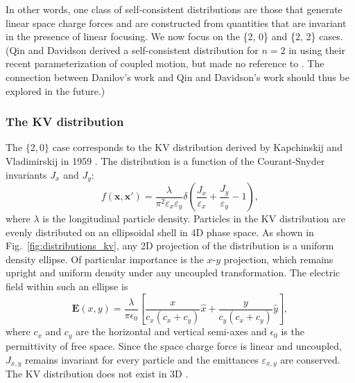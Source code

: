 In other words, one class of self-consistent distributions are those that generate linear space charge forces and are constructed from quantities that are invariant in the presence of linear focusing. We now focus on the \{2, 0\} and \{2, 2\} cases. (Qin and Davidson derived a self-consistent distribution for $n = 2$ in \cite{Qin2013} using their recent parameterization of coupled motion, but made no reference to \cite{Danilov2003}. The connection between Danilov's work and Qin and Davidson's work should thus be explored in the future.)


\subsubsection{The KV distribution}

The $\{2, 0\}$ case corresponds to the KV distribution derived by Kapchinskij and Vladimirskij in 1959 \cite{Kapchinskij1959}. The distribution is a function of the Courant-Snyder invariants $J_x$ and $J_y$:
%
\begin{equation}
    f(\mathbf{x}, \mathbf{x}') = \frac{\lambda}{\pi^2 \varepsilon_x\varepsilon_y}
    \delta \left(\frac{J_x}{\varepsilon_x} + \frac{J_y}{\varepsilon_y} -1 \right),
\end{equation}
%
where $\lambda$ is the longitudinal particle density. Particles in the KV distribution are evenly distributed on an ellipsoidal shell in 4D phase space. As shown in Fig.~\ref{fig:distributions_kv}, any 2D projection of the distribution is a uniform density ellipse. Of particular importance is the $x$-$y$ projection, which remains upright and uniform density under any uncoupled transformation. The electric field within such an ellipse is
%
\begin{equation}  \label{eq:field_in_upright_ellipse}
    \mathbf{E}(x, y) =
    \frac{\lambda}{\pi\epsilon_0}
    \left[ 
        \frac{x}{c_x\left(c_x+c_y\right)} \hat{x}
        + \frac{y}{c_y\left(c_x+c_y\right)} \hat{y}
    \right],
\end{equation}
%
where $c_x$ and $c_y$ are the horizontal and vertical semi-axes and $\epsilon_0$ is the permittivity of free space. Since the space charge force is linear and uncoupled, $J_{x,y}$ remains invariant for every particle and the emittances $\varepsilon_{x,y}$ are conserved. The KV distribution does not exist in 3D \cite{Sacherer1968}.


